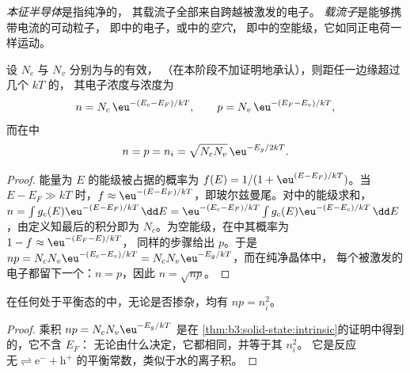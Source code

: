 \begin{definition}[载流子]\label{def:b3:solid-state:carriers}
\emph{本征半导体}是指纯净的，
其载流子全部来自跨越被激发的电子。
\emph{载流子}是能够携带电流的可动粒子，
即中的电子，或中的\emph{空穴}，
即中的空能级，它如同正电荷一样运动。
\end{definition}

\begin{theorem}[本征载流子浓度]\label{thm:b3:solid-state:intrinsic}
设 $N_c$ 与 $N_v$ 分别为与的有效，
（在本阶段不加证明地承认），则距任一边缘超过几个 $kT$ 的，
其电子浓度与浓度为
\[
  n = N_c\,\eu^{-(E_c - E_F)/kT}, \qquad p = N_v\,\eu^{-(E_F - E_v)/kT},
\]
而在中
\[
  n = p = n_i = \sqrt{N_cN_v}\,\eu^{-E_g/2kT}.
\]
\end{theorem}

\begin{proof}
能量为 $E$ 的能级被占据的概率为 $f(E) = 1/(1 + \eu^{(E - E_F)/kT})$。当
$E - E_F \gg kT$ 时，$f \approx \eu^{-(E - E_F)/kT}$，即玻尔兹曼尾。对中的能级求和，
$n = \int g_c(E)\eu^{-(E - E_F)/kT}\,\dd E = \eu^{-(E_c - E_F)/kT}\int g_c(E)\eu^{-(E - E_c)/kT}\,\dd E$，由定义知最后的积分即为
$N_c$。为空能级，在中其概率为 $1 - f \approx \eu^{-(E_F - E)/kT}$，
同样的步骤给出 $p$。于是 $np = N_cN_v\eu^{-(E_c - E_v)/kT} = N_cN_v\eu^{-E_g/kT}$，而在纯净晶体中，
每个被激发的电子都留下一个：$n = p$，因此 $n = \sqrt{np}$。
\end{proof}

\begin{proposition}[质量作用定律]\label{prop:b3:solid-state:mass-action}
在任何处于平衡态的中，无论是否掺杂，均有 $np = n_i^2$。
\end{proposition}

\begin{proof}
乘积 $np = N_cN_v\eu^{-E_g/kT}$ 是在
\cref{thm:b3:solid-state:intrinsic}的证明中得到的，它不含 $E_F$：
无论由什么决定，它都相同，并等于其 $n_i^2$。
它是反应 $\text{无} \rightleftharpoons \mathrm e^- + \mathrm h^+$ 的平衡常数，类似于水的离子积。
\end{proof}

